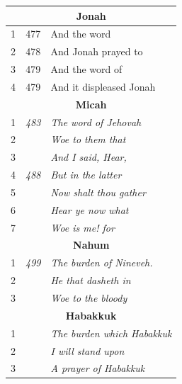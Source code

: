 \documentclass{article}
\newlength{\minipageheight}
\begin{document}
\begin{flushright}
\begin{minipage}[r][\minipageheight][t]{3in}
\begin{longtable}{ccl}
            \multicolumn{3}{c}{\textbf{Jonah}}                                     \\
            \hline
            1           & 477          & And the word                              \\
            2           & 478          & And Jonah prayed to                       \\
            3           & 479          & And the word of                           \\
            4           & 479          & And it displeased Jonah                   \\

            \multicolumn{3}{c}{\textbf{Micah}}                                     \\
            \hline
            1           & \textit{483} & \textit{The word of Jehovah}              \\
            2           &              & \textit{Woe to them that}                 \\
            3           &              & \textit{And I said, Hear,}                \\
            4           & \textit{488} & \textit{But in the latter}                \\
            5           &              & \textit{Now shalt thou gather}            \\
            6           &              & \textit{Hear ye now what}                 \\
            7           &              & \textit{Woe is me! for}                   \\

            \multicolumn{3}{c}{\textbf{Nahum}}                                     \\
            \hline
            1           & \textit{499} & \textit{The burden of Nineveh.}           \\
            2           &              & \textit{He that dasheth in}               \\
            3           &              & \textit{Woe to the bloody}                \\

            \multicolumn{3}{c}{\textbf{Habakkuk}}                                  \\
            \hline
            1           &              & \textit{The burden which Habakkuk}        \\
            2           &              & \textit{I will stand upon}                \\
            3           &              & \textit{A prayer of Habakkuk}             \\


\end{longtable}
\end{minipage}
\end{flushright}
\end{document}
